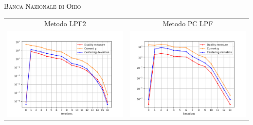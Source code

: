 
\begin{frame}{\textsc{\LARGE \textcolor{black}{Banca Nazionale di Ohio}}}
	\centering
	\begin{tabular}{c@{}c}
		\small{Metodo LPF2} & \small{Metodo PC LPF} \\
		\includegraphics[scale = 0.33]{onb_LPF2}
		&\includegraphics[scale = 0.33]{onb_MER2}\\ 
	\end{tabular}
\end{frame}

